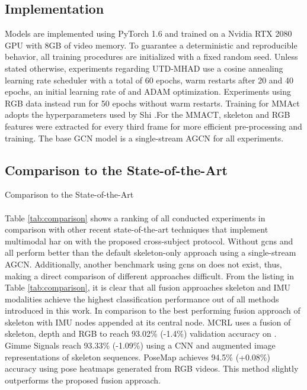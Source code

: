 \subsection{Implementation}

Models are implemented using PyTorch 1.6 and trained on a Nvidia RTX 2080 GPU with 8GB of video memory. To guarantee a deterministic and reproducible behavior, all training procedures are initialized with a fixed random seed. Unless stated otherwise, experiments regarding UTD-MHAD use a cosine annealing learning rate scheduler \cite{DBLP:conf/iclr/LoshchilovH17} with a total of 60 epochs, warm restarts after 20 and 40 epochs, an initial learning rate of  and ADAM \cite{DBLP:journals/corr/KingmaB14} optimization. Experiments using RGB data instead run for 50 epochs without warm restarts. Training for MMAct adopts the hyperparameters used by Shi \andothers\cite{DBLP:conf/cvpr/ShiZCL19a}.For the MMACT, skeleton and RGB features were extracted for every third frame for more efficient pre-processing and training. 
The base GCN model is a single-stream AGCN for all experiments.


\subsection{Comparison to the State-of-the-Art}

\begin{table}[h]
    
    \centering
    \subfloat[MMAct]{
        \tablemmact
    }
    \caption{Comparison to the State-of-the-Art}
\end{table}
\paragraph{\utdmhad{}}
Table \ref{tab:comparison} shows a ranking of all conducted experiments in comparison with other recent state-of-the-art techniques that implement multimodal \gls{har} on \utdmhad{} with the proposed cross-subject protocol. Without \glspl{gcn} and all perform better than the default skeleton-only approach using a single-stream AGCN. 
Additionally, another benchmark using \glspl{gcn} on \utdmhad{} does not exist, thus, making a direct comparison of different approaches difficult. From the listing in Table \ref{tab:comparison}, it is clear that all fusion approaches skeleton and IMU modalities achieve the highest classification performance out of all methods introduced in this work. 
In comparison to the best performing fusion approach of skeleton with IMU nodes appended at its central node.
MCRL \cite{2019ISenJ..19.1862L} uses a fusion of skeleton, depth and RGB to reach 93.02\% (-1.4\%) validation accuracy on \utdmhad{}. Gimme Signals \cite{DBLP:conf/iros/MemmesheimerTP20} reach 93.33\% (-1.09\%) using a CNN and augmented image representations of skeleton sequences. PoseMap \cite{DBLP:conf/cvpr/LiuY18} achieves 94.5\% (+0.08\%) accuracy using pose heatmaps generated from RGB videos. This method slightly outperforms the proposed fusion approach.



